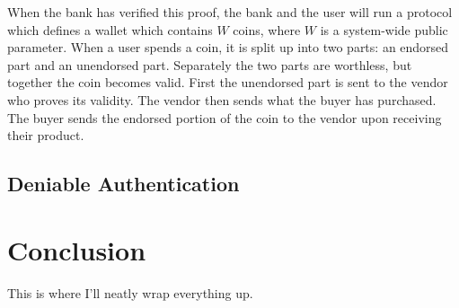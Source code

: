 \documentclass{sig-alternate}
\begin{document}
	When the bank has verified this proof, the bank and the user will run a protocol
	which defines a wallet which contains $W$ coins, where $W$ is a system-wide
	public parameter. When a user spends a coin, it is split up into two parts: an
	endorsed part and an unendorsed part. Separately the two parts are worthless, but
	together the coin becomes valid. First the unendorsed part is sent to the vendor
	who proves its validity. The vendor then sends what the buyer has purchased. The
	buyer sends the endorsed portion of the coin to the vendor upon receiving their
	product.
	
	\subsection{Deniable Authentication}

\section{Conclusion}
	This is where I'll neatly wrap everything up.




\end{document}
